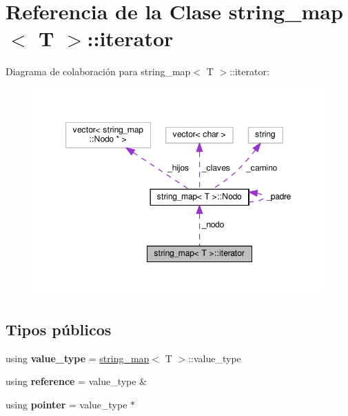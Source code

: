 \hypertarget{classstring__map_1_1iterator}{\section{Referencia de la Clase string\-\_\-map$<$ T $>$\-:\-:iterator}
\label{classstring__map_1_1iterator}
}


Diagrama de colaboración para string\-\_\-map$<$ T $>$\-:\-:iterator\-:
\nopagebreak
\begin{figure}[H]
\begin{center}
\leavevmode
\includegraphics[width=349pt]{classstring__map_1_1iterator__coll__graph}
\end{center}
\end{figure}
\subsection*{Tipos públicos}
\begin{DoxyCompactItemize}
\item 
\hypertarget{classstring__map_1_1iterator_a82c72ceda356ce40c68ad689205fd225}{using {\bfseries value\-\_\-type} = \hyperlink{classstring__map}{string\-\_\-map}$<$ T $>$\-::value\-\_\-type}\label{classstring__map_1_1iterator_a82c72ceda356ce40c68ad689205fd225}

\item 
\hypertarget{classstring__map_1_1iterator_a2d813421047005b3fbf3e66b1e1f6535}{using {\bfseries reference} = value\-\_\-type \&}\label{classstring__map_1_1iterator_a2d813421047005b3fbf3e66b1e1f6535}

\item 
\hypertarget{classstring__map_1_1iterator_a3be8d54fc66efd989b16c38891c5d0fd}{using {\bfseries pointer} = value\-\_\-type $\ast$}\label{classstring__map_1_1iterator_a3be8d54fc66efd989b16c38891c5d0fd}

\end{DoxyCompactItemize}
